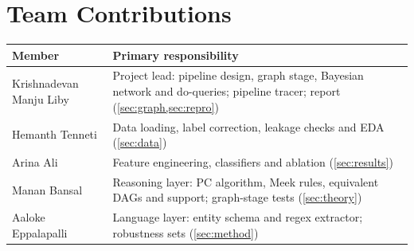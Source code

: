 \documentclass[12pt,a4paper]{article}
\newcommand{\MemberA}{Krishnadevan Manju Liby}
\newcommand{\MemberB}{Hemanth Tenneti}
\newcommand{\MemberC}{Arina Ali}
\newcommand{\MemberD}{Manan Bansal}
\newcommand{\MemberE}{Aaloke Eppalapalli}
\newcommand{\thead}[1]{\textbf{#1}}
\begin{document}
\section{Team Contributions}
\begin{table}[!htbp]
\centering\small
\begin{tabularx}{\linewidth}{@{}lX@{}}
\toprule
\thead{Member} & \thead{Primary responsibility} \\
\midrule
\MemberA & Project lead: pipeline design, graph stage, Bayesian network and do-queries; pipeline tracer; report (\cref{sec:graph,sec:repro}) \\
\rowcolor{rowtint} \MemberB & Data loading, label correction, leakage checks and EDA (\cref{sec:data}) \\
\MemberC & Feature engineering, classifiers and ablation (\cref{sec:results}) \\
\rowcolor{rowtint} \MemberD & Reasoning layer: PC algorithm, Meek rules, equivalent DAGs and support; graph-stage tests (\cref{sec:theory}) \\
\MemberE & Language layer: entity schema and regex extractor; robustness sets (\cref{sec:method}) \\
\bottomrule
\end{tabularx}
\end{table}
\end{document}
